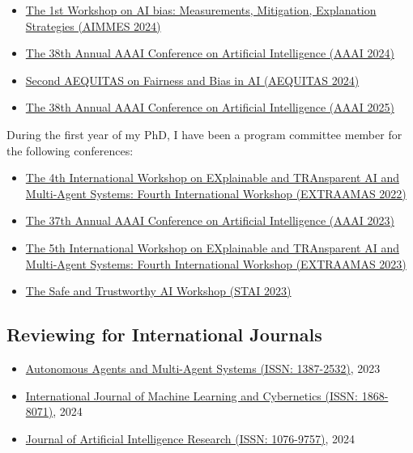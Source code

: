 \documentclass[11pt]{article}
\begin{document}
\begin{itemize}
	\item \href{https://fairnesscluster.github.io/aimmes23.github.io/index.html}{The 1st Workshop on AI bias: Measurements, Mitigation, Explanation Strategies (AIMMES 2024)}
	\item \href{https://apice.unibo.it/xwiki/bin/view/Event/Aaai2024}{The 38th Annual AAAI Conference on Artificial Intelligence (AAAI 2024)}
	\item \href{https://aequitas-aod.github.io/aequitas-ecai24.github.io/pc-member.html}{Second AEQUITAS on Fairness and Bias in AI (AEQUITAS 2024)}
	\item \href{https://aaai.org/conference/aaai/aaai-25/}{The 38th Annual AAAI Conference on Artificial Intelligence (AAAI 2025)}
\end{itemize}
%
During the first year of my PhD, I have been a program committee member for the following conferences:
%
\begin{itemize}
	\item \href{https://extraamas.ehealth.hevs.ch/archive.html#organizations-2022}{The 4th International Workshop on EXplainable and TRAnsparent AI and Multi-Agent Systems: Fourth International Workshop (EXTRAAMAS 2022)}
	\item \href{https://apice.unibo.it/xwiki/bin/view/Event/Aaai2023}{The 37th Annual AAAI Conference on Artificial Intelligence (AAAI 2023)}
	\item \href{https://apice.unibo.it/xwiki/bin/view/Event/Prima2023}{The 5th International Workshop on EXplainable and TRAnsparent AI and Multi-Agent Systems: Fourth International Workshop (EXTRAAMAS 2023)}
	\item \href{https://web.archive.org/web/20240225110652/https://www.stai.uk/stai-23-iclp}{The Safe and Trustworthy AI Workshop (STAI 2023)}
	\end{itemize}

\subsection{Reviewing for International Journals}\label{subsec:reviewing-for-international-journals}

\begin{itemize}
	\item \href{https://link.springer.com/journal/10458}{Autonomous Agents and Multi-Agent Systems (ISSN: 1387-2532)}, 2023
	\item \href{https://link.springer.com/journal/13042}{International Journal of Machine Learning and Cybernetics (ISSN: 1868-8071)}, 2024
	\item \href{https://www.jair.org/index.php/jair/index}{Journal of Artificial Intelligence Research (ISSN: 1076-9757)}, 2024
\end{itemize}
\end{document}
